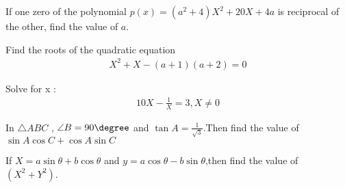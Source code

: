 
\item If one zero of the polynomial $p(x) = (a^2+4)X^2+20X+4a$ is reciprocal of the other, find the value of $a$.

\item Find the roots of the quadratic equation
\begin{align}
 X^2+X-(a+1)(a+2)=0
\end{align}

\item  Solve for x :
\begin{align}
 10X-\frac{1}{X} = 3, X \ne {0}
\end{align}
\item In $\triangle ABC $ , $\angle B = 90\degree$ and $ \tan A = \frac{1}{\sqrt{3}}$.Then find the value of $\sin A \cos C + \cos A\sin C $



\item If $ X = a\sin\theta +b\cos\theta$ and $ y = a\cos\theta - b\sin\theta$,then find the value of $(X^2+Y^2)$.

